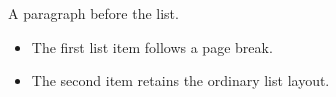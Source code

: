 \documentclass[12pt]{book}
\begin{document}
\LitwebMiniIndexBegin
{}
A paragraph before the list.\par
\begin{itemize}
\item The first list item follows a page break.
\item The second item retains the ordinary list layout.
\end{itemize}
\LitwebMiniIndexEnd
\end{document}

